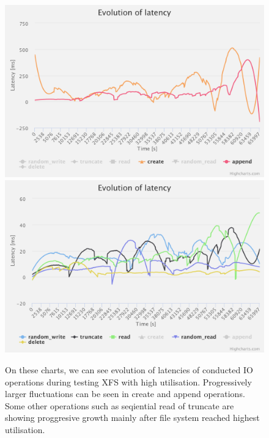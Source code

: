 \documentclass[
  color, %
  table, %
  lof,   %
  lot,   %
]{fithesis3}
\begin{document}
\begin{figure}[!htb]
    \centering
   \begin{minipage}{\textwidth}
        \centering
        \includegraphics[width=\textwidth]{../charts/HDD_xfs/high_ca}
        \includegraphics[width=\textwidth]{../charts/HDD_xfs/high_other}
        \caption[Evolution of latencies of XFS during testing of high utilisation of HDD]{On these charts, we can see evolution of latencies of conducted IO operations during testing XFS with high utilisation. Progressively larger fluctuations can be seen in create and append operations. Some other operations such as seqiential read of truncate are showing proggresive growth mainly after file system reached highest utilisation.}
\label{fig:lats99_xfs}
    \end{minipage}
\end{figure}


\clearpage
\end{document}
